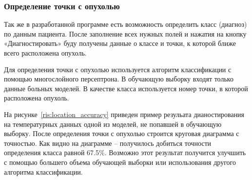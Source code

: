 \subsubsection{Определение точки с опухолью}
\par
Так же в разработанной программе есть возможность определить класс (диагноз) по данным пациента. После заполнение всех нужных полей и нажатия на кнопку «Диагностировать» буду получены данные о классе и точки, к которой ближе всего расположена опухоль. 
\par
Для определения точки с опухолью используется алгоритм классификации с помощью многослойного персептрона. В обучающую выборку входят только данные больных моделей. В качестве класса используется номер точки, в которой расположена опухоль.
\par
На рисунке~\ref{ris:location_accuracy} приведен пример резульата дианостирования на температурных данных одной из моделей, не попавшей в обучающую выборку. После определения точки с опухолью строится круговая диаграмма с точностью. 
Как видно на диаграмме -- получилось добиться точности определения класса равной 67.5\%. Возможно этот результат получится улучшить с помощью большего объема обучающей выборки или использования другого алгоритма классификации.

